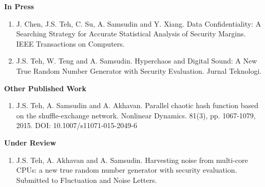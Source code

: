\textbf{In Press}
\begin{enumerate}[resume]
\item J. Chen, J.S. Teh, C. Su, A. Samsudin and Y. Xiang. Data Confidentiality: A Searching Strategy for Accurate Statistical Analysis of Security Margins. IEEE Transactions on Computers. 
\item J.S. Teh, W. Teng and A. Samsudin. Hyperchaos and Digital Sound: A New True Random Number Generator with Security Evaluation. Jurnal Teknologi. \newline [Scopus]
\end{enumerate}
\newpage
\textbf{Other Published Work}
\begin{enumerate}[resume]
\item J.S. Teh, A. Samsudin and A. Akhavan. Parallel chaotic hash function based on the shuffle-exchange network. Nonlinear Dynamics. 81(3), pp. 1067-1079, 2015. DOI: 10.1007/s11071-015-2049-6 
\end{enumerate}

\textbf{Under Review}
\begin{enumerate}[resume]
\item J.S. Teh, A. Akhavan and A. Samsudin. Harvesting noise from multi-core CPUs: a new true random number generator with security evaluation. Submitted to Fluctuation and Noise Letters. 
\end{enumerate}

\clearpage\pagestyle{plain}
